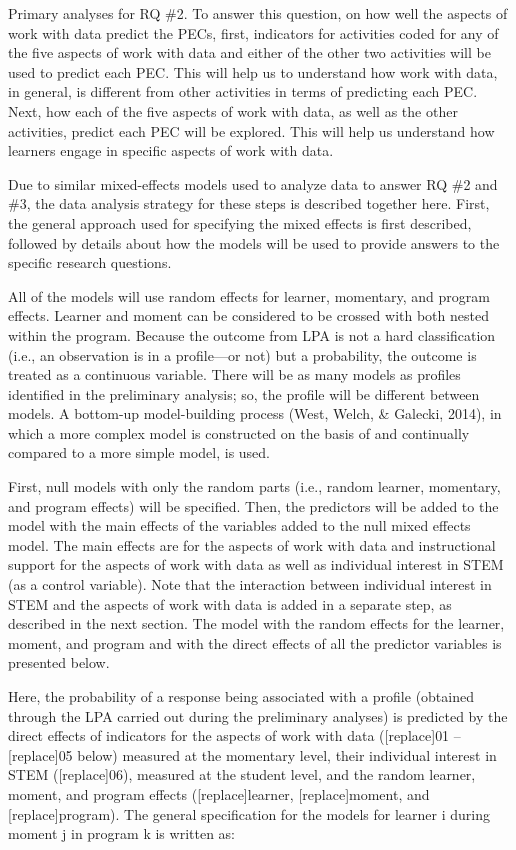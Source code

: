\documentclass[]{msu-thesis}
\theoremstyle{definition}
\theoremstyle{definition}
\theoremstyle{definition}
\theoremstyle{remark}
\begin{document}
Primary analyses for RQ \#2. To answer this question, on how well the
aspects of work with data predict the PECs, first, indicators for
activities coded for any of the five aspects of work with data and
either of the other two activities will be used to predict each PEC.
This will help us to understand how work with data, in general, is
different from other activities in terms of predicting each PEC. Next,
how each of the five aspects of work with data, as well as the other
activities, predict each PEC will be explored. This will help us
understand how learners engage in specific aspects of work with data.

Due to similar mixed-effects models used to analyze data to answer RQ
\#2 and \#3, the data analysis strategy for these steps is described
together here. First, the general approach used for specifying the mixed
effects is first described, followed by details about how the models
will be used to provide answers to the specific research questions.

All of the models will use random effects for learner, momentary, and
program effects. Learner and moment can be considered to be crossed with
both nested within the program. Because the outcome from LPA is not a
hard classification (i.e., an observation is in a profile---or not) but
a probability, the outcome is treated as a continuous variable. There
will be as many models as profiles identified in the preliminary
analysis; so, the profile will be different between models. A bottom-up
model-building process (West, Welch, \& Galecki, 2014), in which a more
complex model is constructed on the basis of and continually compared to
a more simple model, is used.

First, null models with only the random parts (i.e., random learner,
momentary, and program effects) will be specified. Then, the predictors
will be added to the model with the main effects of the variables added
to the null mixed effects model. The main effects are for the aspects of
work with data and instructional support for the aspects of work with
data as well as individual interest in STEM (as a control variable).
Note that the interaction between individual interest in STEM and the
aspects of work with data is added in a separate step, as described in
the next section. The model with the random effects for the learner,
moment, and program and with the direct effects of all the predictor
variables is presented below.

Here, the probability of a response being associated with a profile
(obtained through the LPA carried out during the preliminary analyses)
is predicted by the direct effects of indicators for the aspects of work
with data ({[}replace{]}01 -- {[}replace{]}05 below) measured at the
momentary level, their individual interest in STEM ({[}replace{]}06),
measured at the student level, and the random learner, moment, and
program effects ({[}replace{]}learner, {[}replace{]}moment, and
{[}replace{]}program). The general specification for the models for
learner i during moment j in program k is written as:
\end{document}
